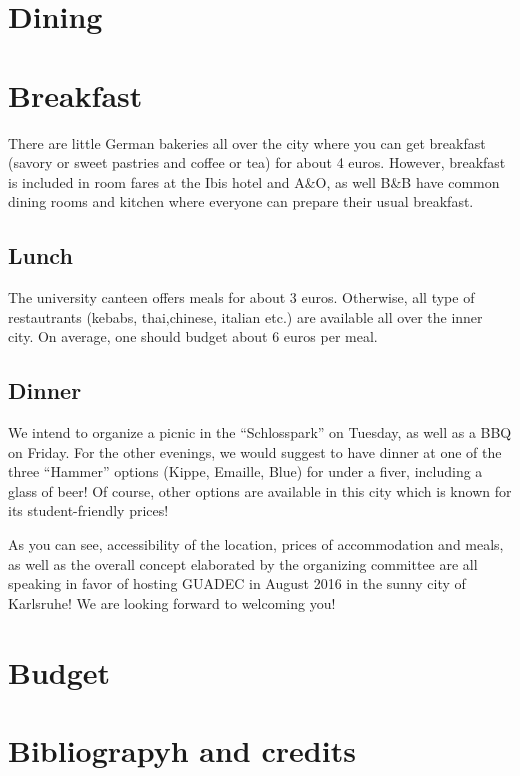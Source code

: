 \section{Dining}

\section{Breakfast}
There are little German bakeries all over the city where you can get breakfast (savory or sweet pastries and coffee or tea) for about 4 euros. However, breakfast is included in room fares at the Ibis hotel and A&O, as well B&B have common dining rooms and kitchen where everyone can prepare their usual breakfast.
 
\subsection{Lunch}
The university canteen offers meals for about 3 euros. Otherwise, all type of restautrants (kebabs, thai,chinese, italian etc.) are available all over the inner city. On average, one should budget about 6 euros per meal.


\subsection{Dinner}
We intend to organize a picnic in the “Schlosspark” on Tuesday, as well as a BBQ on Friday. For the other evenings, we would suggest to have dinner at one of the three “Hammer” options (Kippe, Emaille, Blue) for under a fiver, including a glass of beer! Of course, other options are available in this city which is known for its student-friendly prices!


As you can see, accessibility of the location, prices of accommodation and meals, as well as the overall concept elaborated by the organizing committee are all speaking in favor of hosting GUADEC in August 2016 in the sunny city of Karlsruhe! We are looking forward to welcoming you!

\section{Budget}
\section{Bibliograpyh and credits}